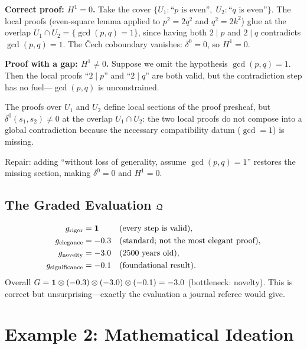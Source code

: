 \textbf{Correct proof: $H^1=0$.}\quad
Take the cover
$\{U_1:\text{``$p$ is even''},\;U_2:\text{``$q$ is even''}\}$.
The local proofs (even-square lemma applied to $p^2=2q^2$ and
$q^2=2k^2$) glue at the overlap
$U_1\cap U_2=\{\gcd(p,q)=1\}$, since having both $2\mid p$ and
$2\mid q$ contradicts $\gcd(p,q)=1$.  The \v{C}ech coboundary
vanishes: $\delta^0=0$, so $H^1=0$.

\textbf{Proof with a gap: $H^1\neq 0$.}\quad
Suppose we omit the hypothesis $\gcd(p,q)=1$.  Then the local
proofs ``$2\mid p$'' and ``$2\mid q$'' are both valid, but the
contradiction step has no fuel---$\gcd(p,q)$ is unconstrained.

\begin{proposition}[Gap = non-trivial $H^1$]
The proofs over $U_1$ and $U_2$ define local sections of the
proof presheaf, but $\delta^0(s_1,s_2)\neq 0$ at the overlap
$U_1\cap U_2$: the two local proofs do not compose into a
global contradiction because the necessary compatibility datum
($\gcd=1$) is missing.
\end{proposition}

Repair: adding ``without loss of generality, assume
$\gcd(p,q)=1$'' restores the missing section, making
$\delta^0=0$ and $H^1=0$.

\subsection{The Graded Evaluation $\mathfrak{Q}$}

\begin{align*}
  g_{\mathrm{rigor}}       &= \mathbf{1}   &&\text{(every step is valid)},\\
  g_{\mathrm{elegance}}    &= -0.3  &&\text{(standard; not the most elegant proof)},\\
  g_{\mathrm{novelty}}     &= -3.0  &&\text{(2500 years old)},\\
  g_{\mathrm{significance}}&= -0.1  &&\text{(foundational result)}.
\end{align*}
Overall $G = \mathbf{1}\otimes(-0.3)\otimes(-3.0)\otimes(-0.1)=-3.0$
(bottleneck: novelty).  This is correct but unsurprising---exactly
the evaluation a journal referee would give.

\medskip

\section{Example 2: Mathematical Ideation}
\label{sec:ideation}

